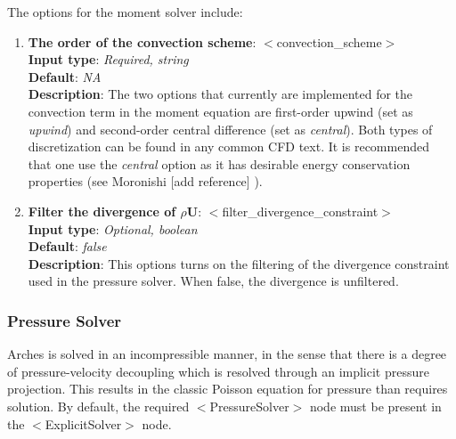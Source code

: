 The options for the moment solver include:
\begin{enumerate}
%
\item {\bf The order of the convection scheme}: $<$convection\_scheme$>$ \\
{\bf Input type}: {\it Required, string} \\
{\bf Default}: {\it NA } \\ 
{\bf Description}: The two options that currently are implemented for the convection term in the moment equation are first-order upwind (set as {\it upwind}) and second-order central difference (set as {\it central}).  Both types of discretization can be found in any common CFD text.  It is recommended that one use the {\it central} option as it has desirable energy conservation properties (see Moronishi [add reference] ).  
%
\item {\bf Filter the divergence of $\rho \mathbf{U}$}: $<$filter\_divergence\_constraint$>$ \\
{\bf Input type}: {\it Optional, boolean} \\
{\bf Default}: {\it false } \\ 
{\bf Description}: This options turns on the filtering of the divergence constraint used in the pressure solver. When false, the divergence is unfiltered.  
%
\end{enumerate}

\subsubsection{Pressure Solver}
Arches is solved in an incompressible manner, in the sense that there is a degree of pressure-velocity decoupling which is resolved through an implicit pressure projection.  This results in the classic Poisson equation for pressure than requires solution.  By default, the required $<$PressureSolver$>$ node must be present in the $<$ExplicitSolver$>$ node.

